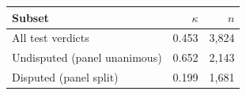 \begin{tabular}{lrr}
\toprule
Subset & $\kappa$ & $n$\\
\midrule
All test verdicts & 0.453 & 3,824\\
Undisputed (panel unanimous) & 0.652 & 2,143\\
Disputed (panel split) & 0.199 & 1,681\\
\bottomrule
\end{tabular}
